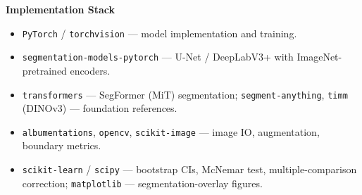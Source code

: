 \documentclass[11pt]{article}
\newcommand{\hdr}[1]{\medskip\noindent\textbf{#1}\par\nopagebreak}
\begin{document}
\hdr{Implementation Stack}
\begin{itemize}
  \item \texttt{PyTorch} / \texttt{torchvision} --- model implementation and training.
  \item \texttt{segmentation-models-pytorch} --- U-Net / DeepLabV3+ with ImageNet-pretrained encoders.
  \item \texttt{transformers} --- SegFormer (MiT) segmentation; \texttt{segment-anything}, \texttt{timm}
  (DINOv3) --- foundation references.
  \item \texttt{albumentations}, \texttt{opencv}, \texttt{scikit-image} --- image IO, augmentation,
  boundary metrics.
  \item \texttt{scikit-learn} / \texttt{scipy} --- bootstrap CIs, McNemar test, multiple-comparison
  correction; \texttt{matplotlib} --- segmentation-overlay figures.
\end{itemize}
\end{document}
